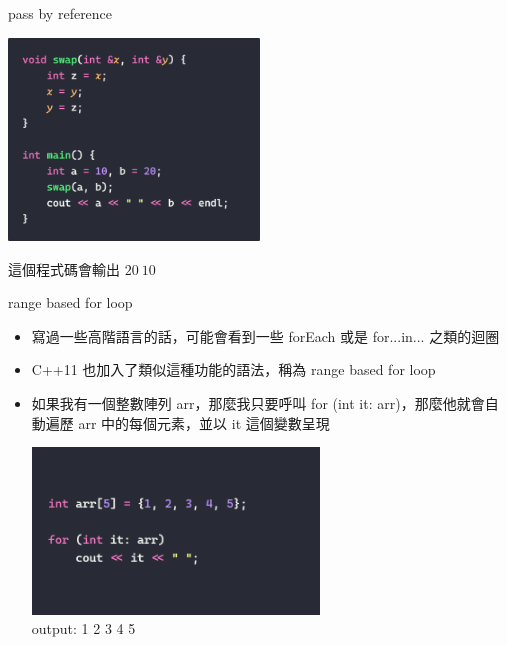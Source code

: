 \documentclass[aspectratio=169]{beamer}
\begin{document}
	\begin{frame}{pass by reference}
		\begin{center}
			\includegraphics[width=0.5\textwidth]{./src/call_by_reference_swap.png}
		\end{center}
		\begin{center}
			這個程式碼會輸出 $20\ 10$
		\end{center}
	\end{frame}

	\begin{frame}{range based for loop}
		\begin{itemize}
			\item<1-> 寫過一些高階語言的話，可能會看到一些 forEach 或是 for...in... 之類的迴圈
			\item<2-> C++11 也加入了類似這種功能的語法，稱為 range based for loop
			\item<3-> 如果我有一個整數陣列 arr，那麼我只要呼叫 for (int it: arr)，那麼他就會自動遍歷 arr 中的每個元素，並以 it 這個變數呈現
			\begin{center}
				\includegraphics[width=0.6\textwidth]{./src/range_based_for_loop_1.png}\\
				output: 1 2 3 4 5
			\end{center}
		\end{itemize}

	\end{frame}
\end{document}

